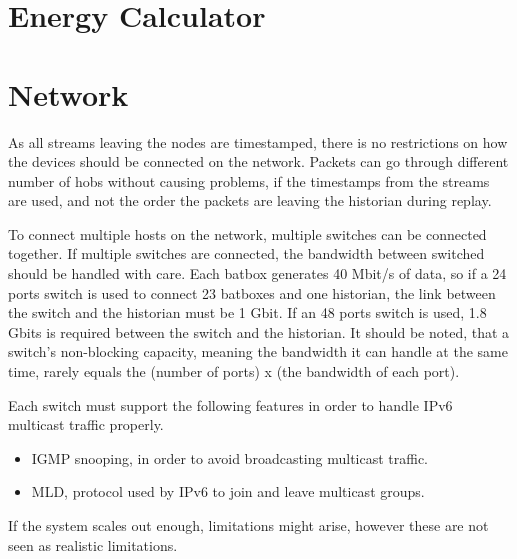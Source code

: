 \section{Energy Calculator}


\section{Network}
As all streams leaving the nodes are timestamped, there is no restrictions on how the devices should be connected on the network. Packets can go through different number of hobs without causing problems, if the timestamps from the streams are used, and not the order the packets are leaving the historian during replay.

To connect multiple hosts on the network, multiple switches can be connected together. If multiple switches are connected, the bandwidth between switched should be handled with care. Each batbox generates 40 Mbit/s of data, so if a 24 ports switch is used to connect 23 batboxes and one historian, the link between the switch and the historian must be 1 Gbit. If an 48 ports switch is used, 1.8 Gbits is required between the switch and the historian. It should be noted, that a switch's non-blocking capacity, meaning the bandwidth it can handle at the same time, rarely equals the (number of ports) x (the bandwidth of each port).

Each switch must support the following features in order to handle IPv6 multicast traffic properly.

\begin{itemize}
	 \item IGMP snooping, in order to avoid broadcasting multicast traffic.
	 \item MLD, protocol used by IPv6 to join and leave multicast groups.
\end{itemize}

If the system scales out enough, limitations might arise, however these are not seen as realistic limitations.





